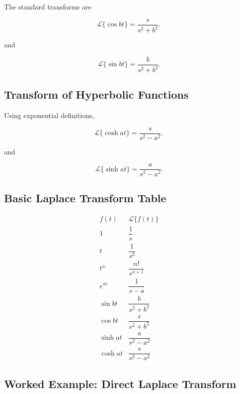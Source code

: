 The standard transforms are

\[
\boxed{
\mathcal{L}\{\cos bt\}
=
\frac{s}{
s^2+b^2
},
}
\]

and

\[
\boxed{
\mathcal{L}\{\sin bt\}
=
\frac{b}{
s^2+b^2
}.
}
\]

\subsection{Transform of Hyperbolic Functions}
\label{subsec:laplace-hyperbolic}

Using exponential definitions,

\[
\boxed{
\mathcal{L}\{\cosh at\}
=
\frac{s}{
s^2-a^2
},
}
\]

and

\[
\boxed{
\mathcal{L}\{\sinh at\}
=
\frac{a}{
s^2-a^2
}.
}
\]

\subsection{Basic Laplace Transform Table}
\label{subsec:basic-laplace-table}

\[
\boxed{
\begin{array}{c|c}
f(t) & \mathcal{L}\{f(t)\}
\\
\hline
1 & \dfrac1s
\\[0.8em]
t & \dfrac1{s^2}
\\[0.8em]
t^n & \dfrac{n!}{s^{n+1}}
\\[0.8em]
e^{at} & \dfrac1{s-a}
\\[0.8em]
\sin bt & \dfrac{b}{s^2+b^2}
\\[0.8em]
\cos bt & \dfrac{s}{s^2+b^2}
\\[0.8em]
\sinh at & \dfrac{a}{s^2-a^2}
\\[0.8em]
\cosh at & \dfrac{s}{s^2-a^2}
\end{array}
}
\]

\subsection{Worked Example: Direct Laplace Transform}
\label{subsec:worked-direct-laplace}

